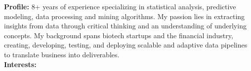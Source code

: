 
\vspace*{-3mm}

\begin{tcolorbox}[
        width=\textwidth,
        colback={gray!20},
        colframe=white,
        sharp corners,
        boxrule=0mm,
        arc=1mm,
    ]
    \vspace*{-1mm}
    \begin{spacing}{1.2}
        \setlength{\columnsep}{5mm}
        \begin{multicols}{2}

            {
                \bf
                \large
                Profile:
            }
            8+ years of experience specializing in statistical analysis, predictive modeling, data processing and mining algorithms. My passion lies in extracting insights from data through critical thinking and an understanding of underlying concepts. My background spans biotech startups and the financial industry, creating, developing, testing, and deploying scalable and adaptive data pipelines to translate business into deliverables.\\%

            {
            \bf
            \large
            Interests:
            }


\end{multicols}
\end{spacing}
\end{tcolorbox}
